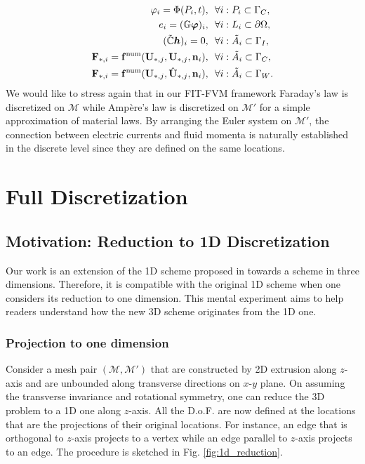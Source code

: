 \documentclass{article}
\begin{document}
\begin{subequations}
\begin{align}
    \varphi_i = \Phi(P_i, t), \ \ &\forall i : P_i \subset \Gamma_C, \\
    e_i = (\mathbb{G}\bm{\varphi})_i,\ \ &\forall i : L_i \subset \partial\Omega, \\
    (\Tilde{\mathbb{C}} \bm{h})_i = 0,\ \ &\forall i : \Tilde{A}_i \subset \Gamma_I, \label{equ:bc_zero_curl_h} \\
    \mathbf{F}_{\ast,i} = \mathbf{f}^\text{num}(\mathbf{U}_{\ast,j}, \mathbf{U}_{\ast,j}, \mathbf{n}_i), \ \ &\forall i: \Tilde{A}_i \subset \Gamma_C, \\
    \mathbf{F}_{\ast,i} = \mathbf{f}^\text{num}(\mathbf{U}_{\ast,j}, \hat{\mathbf{U}}_{\ast,j}, \mathbf{n}_i), \ \ &\forall i: \Tilde{A}_i \subset \Gamma_W.
    \end{align}
\end{subequations}
We would like to stress again that in our FIT-FVM framework Faraday's law is discretized on $\mathcal{M}$ while Amp\`{e}re's law is discretized on $\mathcal{M}'$ for a simple approximation of material laws. By arranging the Euler system on $\mathcal{M}'$, the connection between electric currents and fluid momenta is naturally established in the discrete level since they are defined on the same locations.    


\section{Full Discretization}
\subsection{Motivation: Reduction to 1D Discretization}
Our work is an extension of the 1D scheme proposed in \cite{degond_2012} towards a scheme in three dimensions. Therefore, it is compatible with the original 1D scheme when one considers its reduction to one dimension. This mental experiment aims to help readers understand how the new 3D scheme originates from the 1D one. 
\subsubsection{Projection to one dimension} \label{sec:projection_to_1d}
Consider a mesh pair $(\mathcal{M}, \mathcal{M}')$ that are constructed by 2D extrusion along $z$-axis and are unbounded along transverse directions on $x$-$y$ plane. On assuming the transverse invariance and rotational symmetry, one can reduce the 3D problem to a 1D one along $z$-axis. All the D.o.F. are now defined at the locations that are the projections of their original locations. For instance, an edge that is orthogonal to $z$-axis projects to a vertex while an edge parallel to $z$-axis projects to an edge. The procedure is sketched in Fig. \ref{fig:1d_reduction}.
\end{document}
